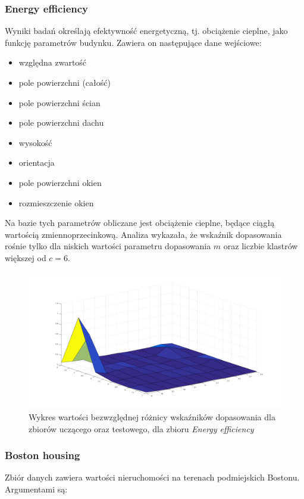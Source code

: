 \documentclass[a4paper; 11pt]{article}
\begin{document}
\subsubsection{Energy efficiency}
Wyniki badań określają efektywność energetyczną, tj. obciążenie cieplne, jako funkcję parametrów budynku.
Zawiera on następujące dane wejściowe:
\begin{itemize}
\item względna zwartość
\item pole powierzchni (całość)
\item pole powierzchni ścian
\item pole powierzchni dachu
\item wysokość
\item orientacja
\item pole powierzchni okien
\item rozmieszczenie okien
\end{itemize}
Na bazie tych parametrów obliczane jest obciążenie cieplne, będące ciągłą wartością zmiennoprzecinkową.
Analiza wykazała, że wskaźnik dopasowania rośnie tylko dla niskich wartości parametru dopasowania $m$ oraz
liczbie klastrów większej od $c = 6$. 

\begin{figure}[h]
\begin{center}
\includegraphics[scale=0.3]{dq_energyeff.png}
\caption{Wykres wartości bezwzględnej różnicy wskaźników dopasowania dla zbiorów uczącego oraz testowego, dla zbioru \emph{Energy efficiency}}
\end{center}
\end{figure}

\subsubsection{Boston housing}
Zbiór danych zawiera wartości nieruchomości na terenach podmiejskich Bostonu. Argumentami są:
\end{document}

